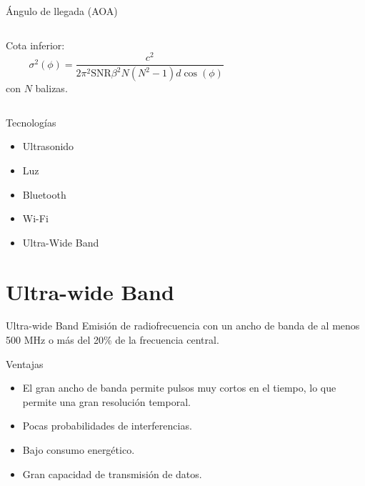 \documentclass{beamer}
\begin{document}
      \begin{frame}{Ángulo de llegada (AOA)}
        \begin{columns}
          \begin{column}{0.5\textwidth}
            Cota inferior:
            \begin{equation*}
              \sigma^2(\phi) = \frac{c^2}{2\pi^2 \text{SNR} \beta^2 N(N^2-1)d\cos(\phi)}
            \end{equation*}
            con $N$ balizas.
          \end{column}
          \begin{column}{0.5\textwidth}  
            \begin{figure}[H]
              \centering
              \def\svgwidth{\linewidth}
              
              \label{fig:AOA}
          \end{figure}
          \end{column}
          \end{columns}
      \end{frame}

  \begin{frame}{Tecnologías}
    \begin{itemize}
      \item Ultrasonido
      \item Luz
      \item Bluetooth
      \item Wi-Fi
      \item Ultra-Wide Band
    \end{itemize}
  \end{frame}

  \section{Ultra-wide Band}

  \begin{frame}{Ultra-wide Band}
    Emisión de radiofrecuencia con un ancho de banda de al menos 500 MHz o más del 20\% de la frecuencia central.
    
    \vspace{0.3cm}
    Ventajas
    \begin{itemize}
      \item El gran ancho de banda permite pulsos muy cortos en el tiempo, lo que permite una gran resolución temporal.
      \item Pocas probabilidades de interferencias.
      \item Bajo consumo energético.
      \item Gran capacidad de transmisión de datos.
    \end{itemize}
  \end{frame}
\end{document}
